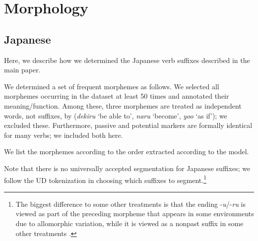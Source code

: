 \documentclass[11pt,letterpaper]{article}
\begin{document}
\section{Morphology}

\subsection{Japanese}

Here, we describe how we determined the Japanese verb suffixes described in the main paper.

We determined a set of frequent morphemes as follows.
We selected all morphemes occurring in the dataset at least 50 times and annotated their meaning/function.
Among these, three morphemes are treated as independent words, not suffixes, by \cite{kaiser2013japanese} (\textit{dekiru} `be able to', \textit{naru} `become', \textit{yoo} `as if'); we excluded these.
Furthermore, passive and potential markers are formally identical for many verbs; we included both here.

We list the morphemes according to the order extracted according to the model.

Note that there  is no universally accepted segmentation for Japanese suffixes; we follow the UD tokenization in choosing which suffixes to segment.\footnote{The biggest difference to some other treatments is that the ending -\textit{u}/-\textit{ru} is viewed as part of the preceding morpheme that appears in some environments due to allomorphic variation, while it is viewed as a nonpast suffix in some other treatments \citep[p.116]{hasegawa2014japanese}.}
\end{document}
